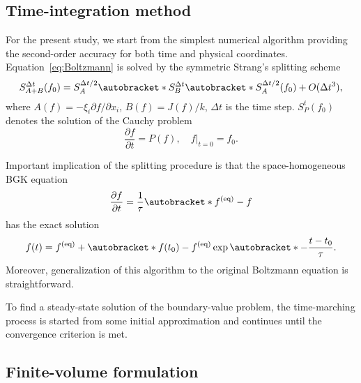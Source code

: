 \documentclass[]{elsarticle} %
\newcommand{\pder}[2][]{\frac{\partial#1}{\partial#2}}
\newcommand{\Pder}[2][]{\partial#1/\partial#2}
\newcommand{\OO}[1]{O(#1)}
\DeclarePairedDelimiter\autobracket()       %
\newcommand{\br}[1]{\autobracket*{#1}}
\newcommand{\equil}[1]{#1^\mathrm{(eq)}}
\begin{document}
\subsection{Time-integration method}\label{sec:numerics:splitting}

For the present study, we start from the simplest numerical algorithm providing the second-order accuracy
for both time and physical coordinates.
Equation~\eqref{eq:Boltzmann} is solved by the symmetric Strang's splitting scheme~\cite{Bobylev2001}
\begin{equation}\label{eq:Strang}
    S^{\Delta{t}}_{A+B}(f_0) = S^{\Delta{t}/2}_A \br{S^{\Delta{t}}_B \br{S^{\Delta{t}/2}_A(f_0)} } + \OO{\Delta{t}^3},
\end{equation}
where \(A(f) = -\xi_i\Pder[f]{x_i}\), \(B(f) = J(f)/k\), \(\Delta{t}\) is the time step.
\(S^t_P (f_0)\) denotes the solution of the Cauchy problem
\begin{equation}\label{eq:Cauchy}
    \pder[f]{t} = P(f), \quad f|_{t=0} = f_0.
\end{equation}

Important implication of the splitting procedure is that the space-homogeneous BGK equation
\begin{equation}\label{eq:bgk_homogeneous}
    \pder[f]{t} = \frac1\tau \br{\equil{f}-f}
\end{equation}
has the exact solution
\begin{equation}\label{eq:bgk_exact}
    f(t) = \equil{f} + \br{f(t_0)-\equil{f}}\exp\br{-\frac{t-t_0}\tau}.
\end{equation}
Moreover, generalization of this algorithm to the original Boltzmann equation is straightforward.

To find a steady-state solution of the boundary-value problem,
the time-marching process is started from some initial approximation
and continues until the convergence criterion is met.

\subsection{Finite-volume formulation}\label{sec:numerics:fv}
\end{document}
